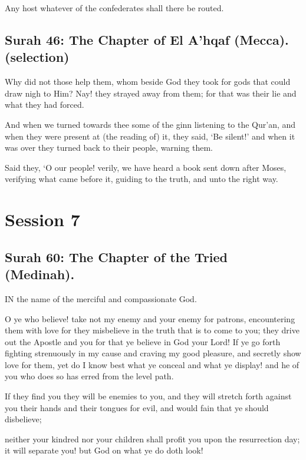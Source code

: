 \documentclass[fontsize=14pt, letterpaper, notitlepage, openany, DIV=12]{scrbook} %
\begin{document}
\noindent[38:11]
Any host whatever of the confederates shall there be routed.


\section[Surah 46: The Chapter of El A'hqaf (Mecca).]{Surah 46: The Chapter of El A'hqaf (Mecca).\\ (selection)}


\noindent[46:28]
Why did not those help them, whom beside God they took for gods that could draw nigh
to Him? Nay! they strayed away from them; for that was their lie and what they had forced.

\noindent[46:29]
And when we turned towards thee some of the ginn listening to the Qur'an, and when
they were present at (the reading of) it, they said, `Be silent!' and when it was over they turned
back to their people, warning them.

\noindent[46:30]
Said they, `O our people! verily, we have heard a book sent down after Moses, verifying
what came before it, guiding to the truth, and unto the right way.

\clearpage
\chapter{Session 7}


\section{Surah 60: The Chapter of the Tried (Medinah).}


IN the name of the merciful and compassionate God.

\noindent[60:1]
O ye who believe! take not my enemy and your enemy for patrons, encountering them
with love for they misbelieve in the truth that is to come to you; they drive out the Apostle and
you for that ye believe in God your Lord! If ye go forth fighting strenuously in my cause and
craving my good pleasure, and secretly show love for them, yet do I know best what ye conceal
and what ye display! and he of you who does so has erred from the level path.

\noindent[60:2]
If they find you they will be enemies to you, and they will stretch forth against you their
hands and their tongues for evil, and would fain that ye should disbelieve;

\noindent[60:3]
neither your kindred nor your children shall profit you upon the resurrection day; it will
separate you! but God on what ye do doth look!
\end{document}
